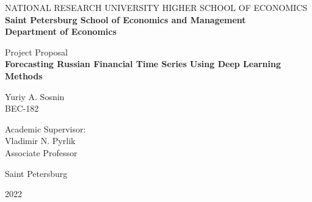 \begin{center}
	\uppercase{National Research University Higher School of Economics}\\
	\textbf{Saint Petersburg School of Economics and Management}\\
	\textbf{Department of Economics}
\end{center}

\vspace{4\baselineskip}

\begin{center}
	Project Proposal\\
	\textbf{Forecasting Russian Financial Time Series Using Deep Learning Methods}
\end{center}

\vspace{2\baselineskip}

\begin{flushright}
	Yuriy A. Sosnin\\
	BEC-182\\

	\vspace{\baselineskip}

	Academic Supervisor:\\
	Vladimir N. Pyrlik\\
	Associate Professor
\end{flushright}

\vspace{\fill}

\begin{center}
	Saint Petersburg

	2022
\end{center}

\thispagestyle{empty}

\clearpage
